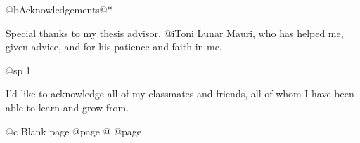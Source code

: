 @b{Acknowledgements}@*

Special thanks to my thesis advisor, @i{Toni Lunar Mauri}, who has helped me, given advice, and for his patience and faith in me.

@sp 1

I'd like to acknowledge all of my classmates and friends, all of whom I have been able to learn and grow from.

@c Blank page
@page
@
@page

